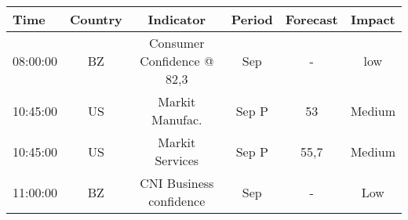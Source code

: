 \documentclass[article,crop=false]{standalone}%
\begin{document}
%
\normalsize%
\setlength{\tabcolsep}{0.15cm}%
\begin{tabular}[h]{l | c c c c c}%
\hline%
\rowcolor{white}%
\textbf{Time}&\textbf{Country}&\textbf{Indicator}&\textbf{Period}&\textbf{Forecast}&\textbf{Impact}\\%
\hline%
\rowcolor{lightgray}%
08:00:00&BZ&Consumer Confidence @ 82,3&Sep&{-}&low\\%
\rowcolor{white}%
10:45:00&US&Markit Manufac.&Sep P&53&Medium\\%
\rowcolor{lightgray}%
10:45:00&US&Markit Services&Sep P&55,7&Medium\\%
\rowcolor{white}%
11:00:00&BZ&CNI Business confidence&Sep&{-}&Low\\%
\hline%
\end{tabular}%
\end{document}
